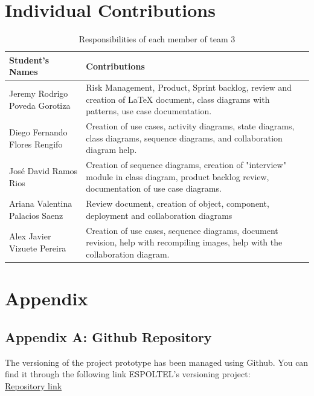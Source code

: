 \documentclass{scrreprt}
\begin{document}
\chapter{Individual Contributions}
\vspace{2cm}

\begin{table}[h!]
    \centering \small
    \renewcommand{\arraystretch}{1.5} 
    \begin{tabular}{|p{5cm}|p{10cm}|} 
    \hline
    \textbf{Student's Names} & \textbf{Contributions} \\ \hline
    Jeremy Rodrigo Poveda Gorotiza & Risk Management, Product, Sprint backlog, review and creation of LaTeX document, class diagrams with patterns, use case documentation. \\ \hline
    Diego Fernando Flores Rengifo & Creation of use cases, activity diagrams, state diagrams, class diagrams, sequence diagrams, and collaboration diagram help. \\ \hline
    José David Ramos Rios & Creation of sequence diagrams, creation of "interview" module in class diagram, product backlog review, documentation of use case diagrams. \\ \hline
    Ariana Valentina Palacios Saenz & Review document, creation of object, component, deployment and collaboration diagrams\\ \hline
    Alex Javier Vizuete Pereira & Creation of use cases, sequence diagrams, document revision, help with recompiling images, help with the collaboration diagram.\\ \hline
    \end{tabular}
    \caption{Responsibilities of each member of team 3}
\end{table} \FloatBarrier 



\chapter{Appendix}

\section{Appendix A: Github Repository}
The versioning of the project prototype has been managed using Github. You can find it through the following link ESPOLTEL's versioning project:\\ \href{https://github.com/Jeremy-Poveda/EspoltelHiringManager}{Repository link}
\end{document}
